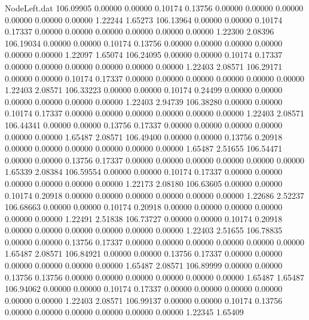 \begin{filecontents}{NodeLeft.dat}
 106.09905    0.00000    0.00000     0.10174    0.13756    0.00000    0.00000    0.00000    0.00000    0.00000    0.00000    1.22244    1.65273
 106.13964    0.00000    0.00000     0.10174    0.17337    0.00000    0.00000    0.00000    0.00000    0.00000    0.00000    1.22300    2.08396
 106.19034    0.00000    0.00000     0.10174    0.13756    0.00000    0.00000    0.00000    0.00000    0.00000    0.00000    1.22097    1.65074
 106.24095    0.00000    0.00000     0.10174    0.17337    0.00000    0.00000    0.00000    0.00000    0.00000    0.00000    1.22403    2.08571
 106.29171    0.00000    0.00000     0.10174    0.17337    0.00000    0.00000    0.00000    0.00000    0.00000    0.00000    1.22403    2.08571
 106.33223    0.00000    0.00000     0.10174    0.24499    0.00000    0.00000    0.00000    0.00000    0.00000    0.00000    1.22403    2.94739
 106.38280    0.00000    0.00000     0.10174    0.17337    0.00000    0.00000    0.00000    0.00000    0.00000    0.00000    1.22403    2.08571
 106.44341    0.00000    0.00000     0.13756    0.17337    0.00000    0.00000    0.00000    0.00000    0.00000    0.00000    1.65487    2.08571
 106.49400    0.00000    0.00000     0.13756    0.20918    0.00000    0.00000    0.00000    0.00000    0.00000    0.00000    1.65487    2.51655
 106.54471    0.00000    0.00000     0.13756    0.17337    0.00000    0.00000    0.00000    0.00000    0.00000    0.00000    1.65339    2.08384
 106.59554    0.00000    0.00000     0.10174    0.17337    0.00000    0.00000    0.00000    0.00000    0.00000    0.00000    1.22173    2.08180
 106.63605    0.00000    0.00000     0.10174    0.20918    0.00000    0.00000    0.00000    0.00000    0.00000    0.00000    1.22686    2.52237
 106.68663    0.00000    0.00000     0.10174    0.20918    0.00000    0.00000    0.00000    0.00000    0.00000    0.00000    1.22491    2.51838
 106.73727    0.00000    0.00000     0.10174    0.20918    0.00000    0.00000    0.00000    0.00000    0.00000    0.00000    1.22403    2.51655
 106.78835    0.00000    0.00000     0.13756    0.17337    0.00000    0.00000    0.00000    0.00000    0.00000    0.00000    1.65487    2.08571
 106.84921    0.00000    0.00000     0.13756    0.17337    0.00000    0.00000    0.00000    0.00000    0.00000    0.00000    1.65487    2.08571
 106.89999    0.00000    0.00000     0.13756    0.13756    0.00000    0.00000    0.00000    0.00000    0.00000    0.00000    1.65487    1.65487
 106.94062    0.00000    0.00000     0.10174    0.17337    0.00000    0.00000    0.00000    0.00000    0.00000    0.00000    1.22403    2.08571
 106.99137    0.00000    0.00000     0.10174    0.13756    0.00000    0.00000    0.00000    0.00000    0.00000    0.00000    1.22345    1.65409

\end{filecontents}
